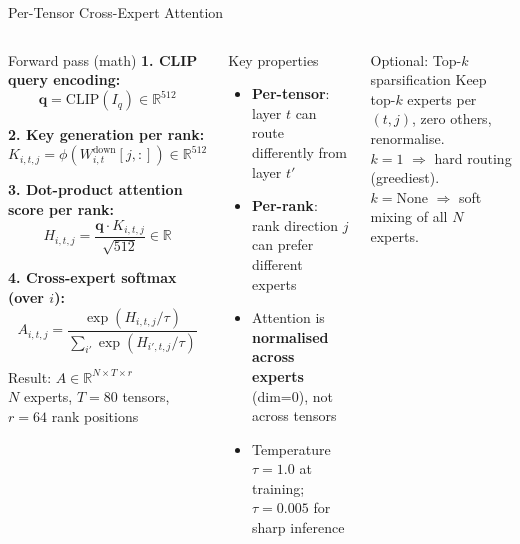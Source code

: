 \documentclass[aspectratio=169,10pt]{beamer}
\newcommand{\RR}{\mathbb{R}}
\begin{document}
\begin{frame}[shrink=15]{Per-Tensor Cross-Expert Attention}
  \begin{columns}[T]
      \begin{block}{Forward pass (math)}
        \textbf{1. CLIP query encoding:}
        \[ \mathbf{q} = \text{CLIP}(I_q) \in \RR^{512} \]

        \textbf{2. Key generation per rank:}
        \[ K_{i,t,j} = \phi(W^\text{down}_{i,t}[j,:]) \in \RR^{512} \]

        \textbf{3. Dot-product attention score per rank:}
        \[ H_{i,t,j} = \frac{\mathbf{q} \cdot K_{i,t,j}}{\sqrt{512}} \in \RR \]

        \textbf{4. Cross-expert softmax (over $i$):}
        \[
          A_{i,t,j} = \frac{\exp(H_{i,t,j}/\tau)}{\sum_{i'}\exp(H_{i',t,j}/\tau)}
        \]

        Result: $A \in \RR^{N \times T \times r}$\\
        \small $N$ experts, $T=80$ tensors, $r=64$ rank positions
      \end{block}

      \begin{block}{Key properties}
        \begin{itemize}
          \item \textbf{Per-tensor}: layer $t$ can route differently from layer $t'$
          \item \textbf{Per-rank}: rank direction $j$ can prefer different experts
          \item Attention is \textbf{normalised across experts} (dim=0), not across tensors
          \item Temperature $\tau = 1.0$ at training; $\tau = 0.005$ for sharp inference
        \end{itemize}
      \end{block}
      \vspace{0.5em}
      \begin{alertblock}{Optional: Top-$k$ sparsification}
        \footnotesize
        Keep top-$k$ experts per $(t,j)$, zero others, renormalise.\\
        $k=1$ $\Rightarrow$ hard routing (greediest).\\
        $k=\text{None}$ $\Rightarrow$ soft mixing of all $N$ experts.
      \end{alertblock}
  \end{columns}
\end{frame}
\end{document}

